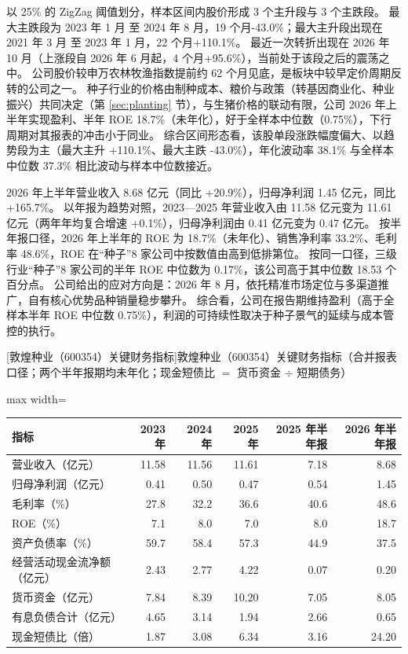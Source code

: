  以 25\% 的 ZigZag 阈值划分，样本区间内股价形成 3 个主升段与 3 个主跌段。 最大主跌段为 2023 年 1 月 至 2024 年 8 月，19 个月-43.0\%；最大主升段出现在 2021 年 3 月 至 2023 年 1 月，22 个月+110.1\%。 最近一次转折出现在 2026 年 10 月（上涨段自 2026 年 6 月起，4 个月+95.6\%），当前处于该段之后的震荡之中。 公司股价较申万农林牧渔指数提前约 62 个月见底，是板块中较早定价周期反转的公司之一。 种子行业的价格由制种成本、粮价与政策（转基因商业化、种业振兴）共同决定（第 \ref{sec:planting} 节），与生猪价格的联动有限，公司 2026 年上半年实现盈利、半年 ROE 18.7\%（未年化），好于全样本中位数（0.75\%），下行周期对其报表的冲击小于同业。 综合区间形态看，该股单段涨跌幅度偏大、以趋势段为主（最大主升 +110.1\%、最大主跌 -43.0\%），年化波动率 38.1\% 与全样本中位数 37.3\% 相比波动与样本中位数接近。

 2026 年上半年营业收入 8.68 亿元（同比 +20.9\%），归母净利润 1.45 亿元，同比 +165.7\%。 以年报为趋势对照，2023---2025 年营业收入由 11.58 亿元变为 11.61 亿元（两年年均复合增速 +0.1\%），归母净利润由 0.41 亿元变为 0.47 亿元。 按半年报口径，2026 年上半年的 ROE 为 18.7\%（未年化）、销售净利率 33.2\%、毛利率 48.6\%，ROE 在“种子”8 家公司中按数值由高到低排第位。 按同一口径，三级行业“种子”8 家公司的半年 ROE 中位数为 0.17\%，该公司高于其中位数 18.53 个百分点。 公司给出的应对方向是：2026 年 8 月，依托精准市场定位与多渠道推广，自有核心优势品种销量稳步攀升。 综合看，公司在报告期维持盈利（高于全样本半年 ROE 中位数 0.75\%），利润的可持续性取决于种子景气的延续与成本管控的执行。

\begin{center}\small\setlength{\tabcolsep}{3.4pt}
[敦煌种业（600354）关键财务指标]{敦煌种业（600354）关键财务指标（合并报表口径；两个半年报期均未年化；现金短债比 $=$ 货币资金 $\div$ 短期债务）}
\begin{adjustbox}{max width=\textwidth}
\begin{tabular}{@{}lrrrrr@{}}
\toprule
指标 & 2023 年 & 2024 年 & 2025 年 & 2025 年半年报 & 2026 年半年报 \\
\midrule
营业收入（亿元） & 11.58 & 11.56 & 11.61 & 7.18 & 8.68 \\
归母净利润（亿元） & 0.41 & 0.50 & 0.47 & 0.54 & 1.45 \\
毛利率（\%） & 27.8 & 32.2 & 36.6 & 40.6 & 48.6 \\
ROE（\%） & 7.1 & 8.0 & 7.0 & 8.0 & 18.7 \\
资产负债率（\%） & 59.7 & 58.4 & 57.3 & 44.9 & 37.5 \\
经营活动现金流净额（亿元） & 2.43 & 2.77 & 4.22 & 0.07 & 0.20 \\
货币资金（亿元） & 7.84 & 8.39 & 10.20 & 7.05 & 8.05 \\
有息负债合计（亿元） & 4.65 & 3.14 & 1.94 & 2.66 & 0.65 \\
现金短债比（倍） & 1.87 & 3.08 & 6.34 & 3.16 & 24.20 \\
\bottomrule
\end{tabular}
\end{adjustbox}
\end{center}


